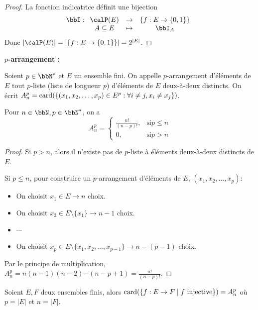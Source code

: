 \begin{proof}
    La fonction indicatrice définit une bijection
    \[ \bbI:
        \begin{array}[t]{ccc}
            \calP(E)      & \to & \{ f: E \to \{ 0, 1 \} \} \\
            A \subseteq E & \tp & \bbI_A
        \end{array}
    \]
    Donc $|\calP(E)| = | \{ f: E \to \{ 0, 1 \} \} | = 2^{|E|}$.
\end{proof}

\textbf{$p$-arrangement :}
\begin{deff}
    Soient $p \in \bbN^*$ et $E$ un ensemble fini.
    On appelle $p$-arrangement d'éléments de $E$ tout $p$-liste (liste de longueur $p$)
    d'éléments de $E$ deux-à-deux distincts.
    On écrit $A^p_n = \operatorname{card}(\{ (x_1, x_2, \ldots, x_p) \in E^p: \forall i \neq j, x_i \neq x_j \})$.
\end{deff}

\begin{thm}
    Pour $n \in \bbN, p \in \bbN^*$, on a
    \[ A_n^p =
        \begin{cases}
            \frac{n!}{(n - p)!}, & \text{si} p \leqslant n \\
            0,                   & \text{si} p > n
        \end{cases}
    \]
\end{thm}

\begin{proof}
    Si $p > n$, alors il n'existe pas de $p$-liste à éléments deux-à-deux distincts de $E$.

    Si $p \leqslant n$, pour construire un $p$-arrangement d'éléments de $E$, $(x_1, x_2, \ldots, x_p)$:
    \begin{itemize}
        \item On choisit $x_1 \in E \to n$ choix.
        \item On choisit $x_2 \in E \setminus \{x_1\} \to n - 1$ choix.
        \item $\cdots$
        \item On choisit $x_p \in E \setminus \{x_1, x_2, \ldots, x_{p-1}\} \to n - (p - 1)$ choix.
    \end{itemize}

    Par le principe de multiplication, $A_n^p = n(n-1)(n-2)\cdots(n-p+1) = \frac{n!}{(n-p)!}$. \qedhere
\end{proof}

\begin{cor}
    Soient $E, F$ deux ensembles finis,
    alors $\operatorname{card}(\{ f: E \to F \mid f \text{ injective} \}) = A_n^p$ où $p = |E|$ et $n = |F|$.
\end{cor}

